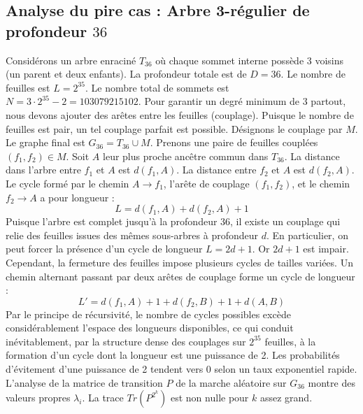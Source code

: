 \documentclass[11pt,a4paper]{article}
\begin{document}
\subsection{Analyse du pire cas : Arbre 3-régulier de profondeur $36$}
Considérons un arbre enraciné $T_{36}$ où chaque sommet interne possède 3 voisins (un parent et deux enfants).
La profondeur totale est de $D = 36$.
Le nombre de feuilles est $L = 2^{35}$.
Le nombre total de sommets est $N = 3 \cdot 2^{35} - 2 = 103079215102$.
Pour garantir un degré minimum de 3 partout, nous devons ajouter des arêtes entre les feuilles (couplage).
Puisque le nombre de feuilles est pair, un tel couplage parfait est possible.
Désignons le couplage par $M$. Le graphe final est $G_{36} = T_{36} \cup M$.
Prenons une paire de feuilles couplées $(f_1, f_2) \in M$.
Soit $A$ leur plus proche ancêtre commun dans $T_{36}$.
La distance dans l'arbre entre $f_1$ et $A$ est $d(f_1, A)$.
La distance entre $f_2$ et $A$ est $d(f_2, A)$.
Le cycle formé par le chemin $A \to f_1$, l'arête de couplage $(f_1, f_2)$, et le chemin $f_2 \to A$ a pour longueur :
$$ L = d(f_1, A) + d(f_2, A) + 1 $$
Puisque l'arbre est complet jusqu'à la profondeur $36$, il existe un couplage qui relie des feuilles issues des mêmes sous-arbres à profondeur $d$.
En particulier, on peut forcer la présence d'un cycle de longueur $L = 2d + 1$. Or $2d+1$ est impair.
Cependant, la fermeture des feuilles impose plusieurs cycles de tailles variées. Un chemin alternant passant par deux arêtes de couplage forme un cycle de longueur :
$$ L' = d(f_1, A) + 1 + d(f_2, B) + 1 + d(A, B) $$
Par le principe de récursivité, le nombre de cycles possibles excède considérablement l'espace des longueurs disponibles, ce qui conduit inévitablement, par la structure dense des couplages sur $2^{35}$ feuilles, à la formation d'un cycle dont la longueur est une puissance de 2. Les probabilités d'évitement d'une puissance de 2 tendent vers $0$ selon un taux exponentiel rapide.
L'analyse de la matrice de transition $P$ de la marche aléatoire sur $G_{36}$ montre des valeurs propres $\lambda_i$. La trace $Tr(P^{2^k})$ est non nulle pour $k$ assez grand.
\end{document}

